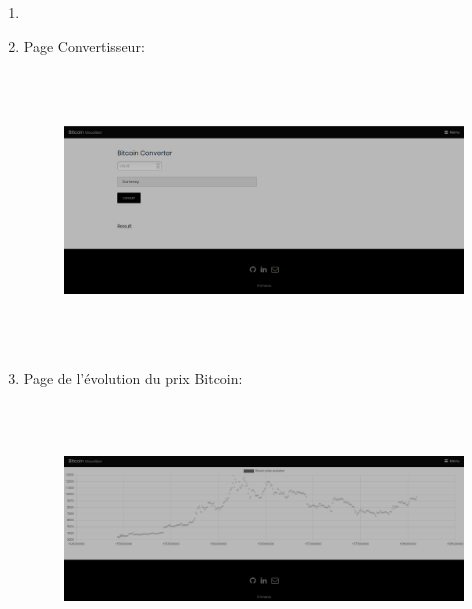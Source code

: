 \documentclass[12pt]{article}
\begin{document}
\begin{enumerate}
\begin{enumerate}
\begin{enumerate}
	\item \par

	\item Page Convertisseur:\par





\begin{figure}[H]
	\begin{Center}
		\includegraphics[width=6.69in,height=2.92in]{./media/image10.png}
	\end{Center}
\end{figure}




\par

	\item Page de l’évolution du prix Bitcoin:\par





\begin{figure}[H]
	\begin{Center}
		\includegraphics[width=6.69in,height=2.62in]{./media/image11.png}
	\end{Center}
\end{figure}





\end{enumerate}
\end{enumerate}
\end{enumerate}
\end{document}
